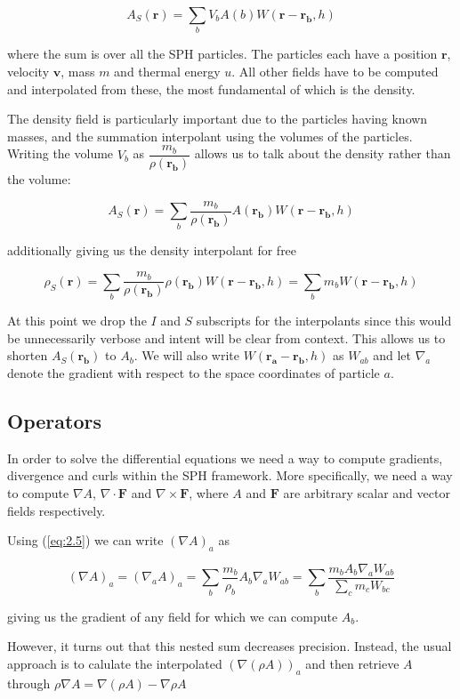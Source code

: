 \documentclass[../main.tex]{subfiles}
\begin{document}
\begin{equation}
    A_S(\bm{r}) = \sum_{b} V_b A(b) W(\bm{r} - \bm{r_b}, h)
\end{equation}

where the sum is over all the SPH particles. The particles each have a position $\bm{r}$, velocity $\bm{v}$, mass $m$ and thermal energy $u$. All other fields have to be computed and interpolated from these, the most fundamental of which is the density.

The density field is particularly important due to the particles having known masses, and the summation interpolant using the volumes of the particles. Writing the volume $V_b$ as $\dfrac{m_b}{\rho(\bm{r_b})}$ allows us to talk about the density rather than the volume:

\begin{equation} \label{eq:2.5}
    A_S(\bm{r}) = \sum_{b} \frac{m_b}{\rho(\bm{r_b})} A(\bm{r_b}) W(\bm{r} - \bm{r_b}, h)
\end{equation}

additionally giving us the density interpolant for free

\begin{equation}
    \rho_S(\bm{r}) = \sum_{b} \frac{m_b}{\rho(\bm{r_b})} \rho(\bm{r_b}) W(\bm{r} - \bm{r_b}, h) = \sum_{b} m_b W(\bm{r} - \bm{r_b}, h)
\end{equation}

At this point we drop the $I$ and $S$ subscripts for the interpolants since this would be unnecessarily verbose and intent will be clear from context. This allows us to shorten $A_S(\bm{r_b})$ to $A_b$. We will also write $W(\bm{r_a} - \bm{r_b}, h)$ as $W_{ab}$ and let $\nabla_a$ denote the gradient with respect to the space coordinates of particle $a$.

\subsection{Operators}
In order to solve the differential equations we need a way to compute gradients, divergence and curls within the SPH framework. More specifically, we need a way to compute $\nabla A$, $\nabla\cdot\bm{F}$ and $\nabla\times\bm{F}$, where $A$ and $\bm{F}$ are arbitrary scalar and vector fields respectively.

Using (\ref{eq:2.5}) we can write $(\nabla A)_a$ as

\begin{equation}
    (\nabla A)_a = (\nabla_a A)_a =
    \sum_b \frac{m_b}{\rho_b} A_b \nabla_a W_{ab} =
    \sum_b \frac{m_b A_b \nabla_a W_{ab}}{\sum_c m_c W_{bc}}
\end{equation}

giving us the gradient of any field for which we can compute $A_b$.

However, it turns out \autocite{monaghan1992} that this nested sum decreases precision. Instead, the usual approach is to calulate the interpolated $(\nabla(\rho A))_a$ and then retrieve $A$ through $\rho\nabla A = \nabla(\rho A) - \nabla\rho A$
\end{document}
